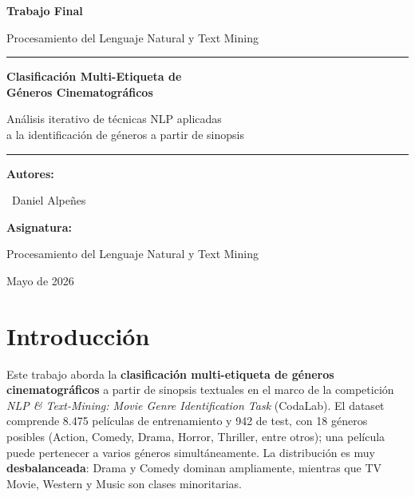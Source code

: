 \documentclass[11pt, a4paper]{article}
\begin{document}
\begin{titlepage}
  \centering
  \vspace*{2cm}
  {\LARGE\bfseries Trabajo Final\par}
  \vspace{0.4cm}
  {\large Procesamiento del Lenguaje Natural y Text Mining\par}
  \vspace{1.5cm}
  \rule{\linewidth}{0.5pt}\par
  \vspace{0.6cm}
  {\Huge\bfseries Clasificación Multi-Etiqueta de\\ Géneros Cinematográficos\par}
  \vspace{0.6cm}
  {\large Análisis iterativo de técnicas NLP aplicadas\\ a la identificación de géneros a partir de sinopsis\par}
  \rule{\linewidth}{0.5pt}\par
  \vspace{2cm}
  {\large\bfseries Autores:\par}
  {\large \ Daniel Alpeñes\par}
  \vspace{0.8cm}
  {\large\bfseries Asignatura:\par}
  {\large Procesamiento del Lenguaje Natural y Text Mining\par}
  \vspace{0.8cm}
  {\large Mayo de 2026\par}
  \vfill
\end{titlepage}

\tableofcontents
\newpage

\section{Introducción}

Este trabajo aborda la \textbf{clasificación multi-etiqueta de géneros cinematográficos} a partir de sinopsis textuales en el marco de la competición \textit{NLP \& Text-Mining: Movie Genre Identification Task} (CodaLab). El dataset comprende 8.475 películas de entrenamiento y 942 de test, con 18 géneros posibles (Action, Comedy, Drama, Horror, Thriller, entre otros); una película puede pertenecer a varios géneros simultáneamente. La distribución es muy \textbf{desbalanceada}: Drama y Comedy dominan ampliamente, mientras que TV Movie, Western y Music son clases minoritarias.
\end{document}
